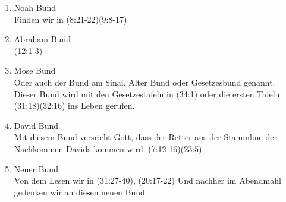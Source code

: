     \begin{enumerate}   
       \item Noah Bund\\
           Finden wir in (8:21-22)(9:8-17) 
       \item  Abraham Bund\\
          (12:1-3)    
      \item Mose Bund\\
          Oder auch der Bund am Sinai, Alter Bund oder Gesetzesbund genannt. Dieser Bund wird mit den Gesetzestafeln in (34:1) oder die ersten Tafeln (31:18)(32:16) ins Leben gerufen.     
      \item David Bund\\
          Mit diesem Bund versricht Gott, dass der Retter aus der Stammline der Nachkommen Davids kommen wird. (7:12-16)(23:5)     
      \item Neuer Bund\\
          Von dem Lesen wir in (31:27-40), (20:17-22)
          Und nachher im Abendmahl gedenken wir an diesen neuen Bund.   
    \end{enumerate}
   
